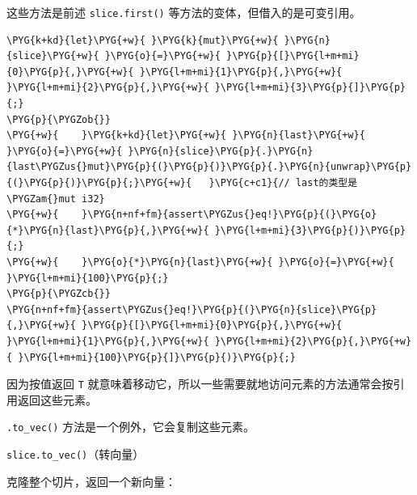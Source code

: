 这些方法是前述 \texttt{slice.first()} 等方法的变体，但借入的是可变引用。

\begin{Verbatim}[commandchars=\\\{\},breaklines=true,breakanywhere=true,fontsize=\codefont,xleftmargin=17bp]
\PYG{k+kd}{let}\PYG{+w}{ }\PYG{k}{mut}\PYG{+w}{ }\PYG{n}{slice}\PYG{+w}{ }\PYG{o}{=}\PYG{+w}{ }\PYG{p}{[}\PYG{l+m+mi}{0}\PYG{p}{,}\PYG{+w}{ }\PYG{l+m+mi}{1}\PYG{p}{,}\PYG{+w}{ }\PYG{l+m+mi}{2}\PYG{p}{,}\PYG{+w}{ }\PYG{l+m+mi}{3}\PYG{p}{]}\PYG{p}{;}
\PYG{p}{\PYGZob{}}
\PYG{+w}{    }\PYG{k+kd}{let}\PYG{+w}{ }\PYG{n}{last}\PYG{+w}{ }\PYG{o}{=}\PYG{+w}{ }\PYG{n}{slice}\PYG{p}{.}\PYG{n}{last\PYGZus{}mut}\PYG{p}{(}\PYG{p}{)}\PYG{p}{.}\PYG{n}{unwrap}\PYG{p}{(}\PYG{p}{)}\PYG{p}{;}\PYG{+w}{   }\PYG{c+c1}{// last的类型是\PYGZam{}mut i32}
\PYG{+w}{    }\PYG{n+nf+fm}{assert\PYGZus{}eq!}\PYG{p}{(}\PYG{o}{*}\PYG{n}{last}\PYG{p}{,}\PYG{+w}{ }\PYG{l+m+mi}{3}\PYG{p}{)}\PYG{p}{;}
\PYG{+w}{    }\PYG{o}{*}\PYG{n}{last}\PYG{+w}{ }\PYG{o}{=}\PYG{+w}{ }\PYG{l+m+mi}{100}\PYG{p}{;}
\PYG{p}{\PYGZcb{}}
\PYG{n+nf+fm}{assert\PYGZus{}eq!}\PYG{p}{(}\PYG{n}{slice}\PYG{p}{,}\PYG{+w}{ }\PYG{p}{[}\PYG{l+m+mi}{0}\PYG{p}{,}\PYG{+w}{ }\PYG{l+m+mi}{1}\PYG{p}{,}\PYG{+w}{ }\PYG{l+m+mi}{2}\PYG{p}{,}\PYG{+w}{ }\PYG{l+m+mi}{100}\PYG{p}{]}\PYG{p}{)}\PYG{p}{;}
\end{Verbatim}

因为按值返回 \texttt{T} 就意味着移动它，所以一些需要就地访问元素的方法通常会按引用返回这些元素。

\texttt{.to\_vec()} 方法是一个例外，它会复制这些元素。

\begin{mySidenote}
\texttt{slice.to\_vec()}（转向量）
\end{mySidenote}

克隆整个切片，返回一个新向量：

